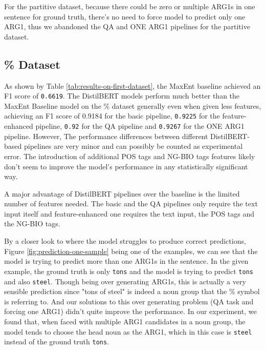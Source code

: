 \documentclass[11pt]{article}
\begin{document}
For the partitive dataset, because there could be zero or multiple ARG1s in one sentence for ground truth, there's no need to force model to predict only one ARG1, thus we abandoned the QA and ONE ARG1 pipelines for the partitive dataset.

\subsection{\% Dataset}
\label{sec:results-first-dataset}

As shown by Table \ref{tab:results-on-first-dataset}, the MaxEnt baseline achieved an F1 score of \verb|0.6619|. The DistilBERT models perform much better than the MaxEnt Baseline model on the \% dataset generally even when given less features, achieving an F1 score of 0.9184 for the basic pipeline,  \verb|0.9225| for the feature-enhanced pipeline,  \verb|0.92| for the QA pipeline and  \verb|0.9267| for the ONE ARG1 pipeline. However, The performance differences between different DistilBERT-based pipelines are very minor and can possibly be counted as experimental error. The introduction of additional POS tags and NG-BIO tags features likely don't seem to improve the model's performance in any statistically significant way.

A major advantage of DistilBERT pipelines over the baseline is the limited number of features needed. The basic and the QA pipelines only require the text input itself and feature-enhanced one requires the text input, the POS tags and the NG-BIO tags.

By a closer look to where the model struggles to produce correct predictions, Figure \ref{fig:prediction-one-sample} being one of the examples, we can see that the model is trying to predict more than one ARG1s in the sentence. In the given example, the ground truth is only \verb|tons| and the model is trying to predict \verb|tons| and also \verb|steel|. Though being over generating ARG1s, this is actually a very sensible prediction since "tons of steel" is indeed a noun group that the \% symbol is referring to. And our solutions to this over generating problem (QA task and forcing one ARG1) didn't quite improve the performance. In our experiment, we found that, when faced with multiple ARG1 candidates in a noun group, the model tends to choose the head noun as the ARG1, which in this case is \verb|steel| instead of the ground truth \verb|tons|.
\end{document}
